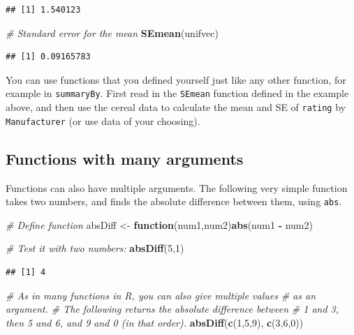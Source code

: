 \documentclass[]{book}
\newenvironment{Shaded}{\begin{snugshade}}{\end{snugshade}}
\newcommand{\CommentTok}[1]{\textcolor[rgb]{0.56,0.35,0.01}{\textit{#1}}}
\newcommand{\ControlFlowTok}[1]{\textcolor[rgb]{0.13,0.29,0.53}{\textbf{#1}}}
\newcommand{\DecValTok}[1]{\textcolor[rgb]{0.00,0.00,0.81}{#1}}
\newcommand{\KeywordTok}[1]{\textcolor[rgb]{0.13,0.29,0.53}{\textbf{#1}}}
\newcommand{\NormalTok}[1]{#1}
\newcommand{\OperatorTok}[1]{\textcolor[rgb]{0.81,0.36,0.00}{\textbf{#1}}}
\newcommand{\StringTok}[1]{\textcolor[rgb]{0.31,0.60,0.02}{#1}}
\let\BeginKnitrBlock\begin \let\EndKnitrBlock\end
\begin{document}
\begin{verbatim}
## [1] 1.540123
\end{verbatim}

\begin{Shaded}
\begin{Highlighting}[]
\CommentTok{# Standard error for the mean}
\KeywordTok{SEmean}\NormalTok{(unifvec)}
\end{Highlighting}
\end{Shaded}

\begin{verbatim}
## [1] 0.09165783
\end{verbatim}

\BeginKnitrBlock{rmdtry}
You can use functions that you defined yourself just like any other function, for example in \texttt{summaryBy}. First read in the \texttt{SEmean} function defined in the example above, and then use the cereal data to calculate the mean and SE of \texttt{rating} by \texttt{Manufacturer} (or use data of your choosing).
\EndKnitrBlock{rmdtry}

\hypertarget{functions-with-many-arguments}{%
\subsection{Functions with many arguments}\label{functions-with-many-arguments}}

Functions can also have multiple arguments. The following very simple function takes two numbers, and finds the absolute difference between them, using \texttt{abs}.

\begin{Shaded}
\begin{Highlighting}[]
\CommentTok{# Define function}
\NormalTok{absDiff <-}\StringTok{ }\ControlFlowTok{function}\NormalTok{(num1,num2)}\KeywordTok{abs}\NormalTok{(num1 }\OperatorTok{-}\StringTok{ }\NormalTok{num2)}

\CommentTok{# Test it with two numbers:}
\KeywordTok{absDiff}\NormalTok{(}\DecValTok{5}\NormalTok{,}\DecValTok{1}\NormalTok{)}
\end{Highlighting}
\end{Shaded}

\begin{verbatim}
## [1] 4
\end{verbatim}

\begin{Shaded}
\begin{Highlighting}[]
\CommentTok{# As in many functions in R, you can also give multiple values}
\CommentTok{# as an argument.}
\CommentTok{# The following returns the absolute difference between }
\CommentTok{# 1 and 3, then 5 and 6, and 9 and 0 (in that order).}
\KeywordTok{absDiff}\NormalTok{(}\KeywordTok{c}\NormalTok{(}\DecValTok{1}\NormalTok{,}\DecValTok{5}\NormalTok{,}\DecValTok{9}\NormalTok{), }\KeywordTok{c}\NormalTok{(}\DecValTok{3}\NormalTok{,}\DecValTok{6}\NormalTok{,}\DecValTok{0}\NormalTok{))}
\end{Highlighting}
\end{Shaded}
\end{document}
